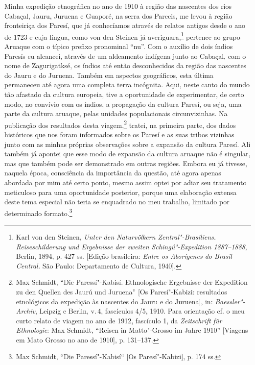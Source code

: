 Minha expedição etnográfica no ano de 1910 à região das nascentes dos
rios Cabaçal, Jauru, Juruena e Guaporé, na serra dos Parecis, me levou à
região fronteiriça dos Paresí, que já conhecíamos através de relatos
antigos desde o ano de 1723 e cuja língua, como von den Steinen já
averiguara,\footnote{Karl von den Steinen, \emph{Unter den Naturvölkern
  Zentral"-Brasiliens. Reiseschilderung und Ergebnisse der zweiten
  Schingú"-Expedition 1887--1888}, Berlin, 1894, p. 427 ss. {[}Edição
  brasileira: \emph{Entre os Aborígenes do Brasil Central.} São Paulo:
  Departamento de Cultura, 1940{]}.} pertence ao grupo Aruaque com o
típico prefixo pronominal ``nu''. Com o auxílio de dois índios Paresís
eu alcancei, através de um aldeamento indígena junto ao Cabaçal, com o
nome de Zagurigatksé, os índios até então desconhecidos da região das
nascentes do Jauru e do Juruena. Também em aspectos geográficos, esta
última permaneceu até agora uma completa terra incógnita. Aqui, neste
canto do mundo tão afastado da cultura europeia, tive a oportunidade de
experimentar, de certo modo, no convívio com os índios, a propagação da
cultura Paresí, ou seja, uma parte da cultura aruaque, pelas unidades
populacionais circunvizinhas. Na publicação dos resultados desta
viagem,\footnote{Max Schmidt, ``Die Paressí"-Kabisí. Ethnologische
  Ergebnisse der Expedition zu den Quellen des Jaurú und Juruena''
  {[}Os Paresí"-Kabizi: resultados etnológicos da expedição às nascentes
  do Jauru e do Juruena{]}, in: \emph{Baessler"-Archiv}, Leipzig e
  Berlin, v.\,4, fascículos 4/5, 1910. Para orientação cf. o meu curto
  relato de viagem no ano de 1912, fascículo 1, da \emph{Zeitschrift für
  Ethnologie}: Max Schmidt, ``Reisen in Matto"-Grosso im Jahre 1910''
  {[}Viagens em Mato Grosso no ano de 1910{]}, p. 131--137.} tratei, na
primeira parte, dos dados históricos que nos foram informados sobre os
Paresí e as suas tribos vizinhas junto com as minhas próprias
observações sobre a expansão da cultura Paresí. Ali também já apontei
que esse modo de expansão da cultura aruaque não é singular, mas que
também pode ser demonstrado em outras regiões. Embora eu já tivesse,
naquela época, consciência da importância da questão, até agora apenas
abordada por mim até certo ponto, mesmo assim optei por adiar seu
tratamento meticuloso para uma oportunidade posterior, porque uma
elaboração extensa deste tema especial não teria se enquadrado no meu
trabalho, limitado por determinado formato.\footnote{Max Schmidt, ``Die
  Paressí"-Kabisí`` {[}Os Paresí"-Kabizi{]}, p. 174 ss.}


